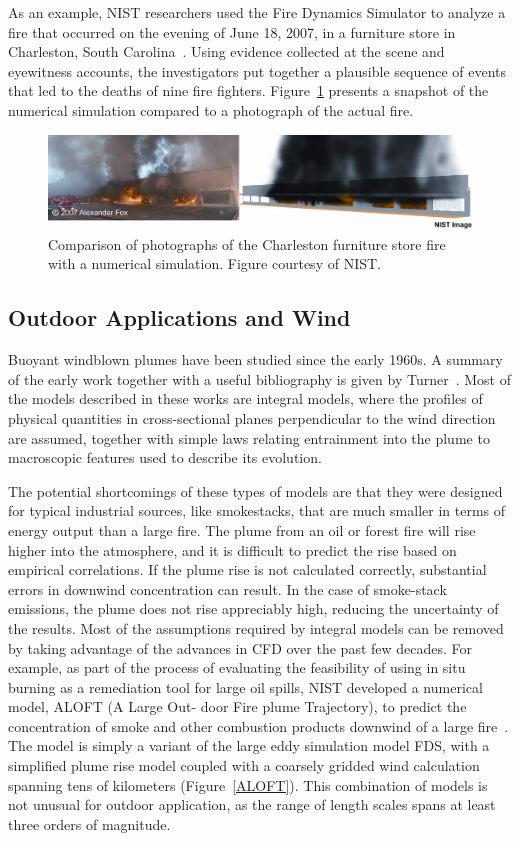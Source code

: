 \documentclass[graybox]{svmult}
\begin{document}
As an example, NIST researchers used the Fire Dynamics Simulator to analyze a fire that occurred on the evening of June 18, 2007, in a furniture store in Charleston, South Carolina~\cite{Bryner:2011}. Using evidence collected at the scene and eyewitness accounts, the investigators put together a plausible sequence of events that led to the deaths of nine fire fighters. Figure~\ref{furniture_store} presents a snapshot of the numerical simulation compared to a photograph of the actual fire.
\begin{figure}[ht]
\includegraphics[width=\textwidth]{Fig_store_fire}
\caption{Comparison of photographs of the Charleston furniture store fire with a numerical simulation. Figure courtesy of NIST.}
\label{furniture_store}
\end{figure}



\subsection{Outdoor Applications and Wind}

Buoyant windblown plumes have been studied since the early 1960s. A summary of the early work together with a useful bibliography is given by Turner~\cite{Turner}. Most of the models described in these works are integral models, where the profiles of physical quantities in cross-sectional planes perpendicular to the wind direction are assumed, together with simple laws relating entrainment into the plume to macroscopic features used to describe its evolution.

The potential shortcomings of these types of models are that they were designed for typical industrial sources, like smokestacks, that are much smaller in terms of energy output than a large fire. The plume from an oil or forest fire will rise higher into the atmosphere, and it is difficult to predict the rise based on empirical correlations. If the plume rise is not calculated correctly, substantial errors in downwind concentration can result. In the case of smoke-stack emissions, the plume does not rise appreciably high, reducing the uncertainty of the results.
Most of the assumptions required by integral models can be removed by taking advantage of the advances in CFD over the past few decades. For example, as part of the process of evaluating the feasibility of using in situ burning as a remediation tool for large oil spills, NIST developed a numerical model, ALOFT (A Large Out- door Fire plume Trajectory), to predict the concentration of smoke and other combustion products downwind of a large fire~\cite{Baum}. The model is simply a variant of the large eddy simulation model FDS, with a simplified plume rise model coupled with a coarsely gridded wind calculation spanning tens of kilometers (Figure~\ref{ALOFT}). This combination of models is not unusual for outdoor application, as the range of length scales spans at least three orders of magnitude.
\end{document}
